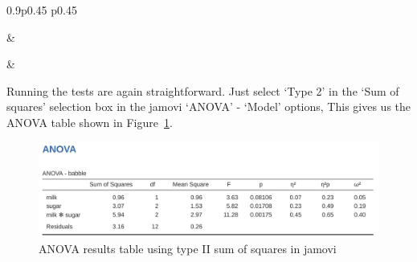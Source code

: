 \documentclass[
  a4paper,
]{book}
\begin{document}
\begin{table}[ht]
\caption{\label{tbl-tab14-28}Type II tests for the sugar \(\times\) milk interaction term }\tabularnewline

\begin{centerbox}
\begin{threeparttable}
\setlength{\tabcolsep}{0pt}
\begin{tabularx}{0.9\textwidth}{p{} p{}}



 &
 \tabularnewline[-0.5pt]



 &
 \tabularnewline[-0.5pt]


\end{tabularx} 

\end{threeparttable}\par\end{centerbox}

\end{table}
 

Running the tests are again straightforward. Just select `Type 2' in the
`Sum of squares' selection box in the jamovi `ANOVA' - `Model' options,
This gives us the ANOVA table shown in Figure~\ref{fig-fig14-30}.

\begin{figure}

\includegraphics[width=1\textwidth,height=\textheight]{images/fig14-30.png} \hfill{}

\caption{\label{fig-fig14-30}ANOVA results table using type II sum of
squares in jamovi}

\end{figure}
\end{document}
